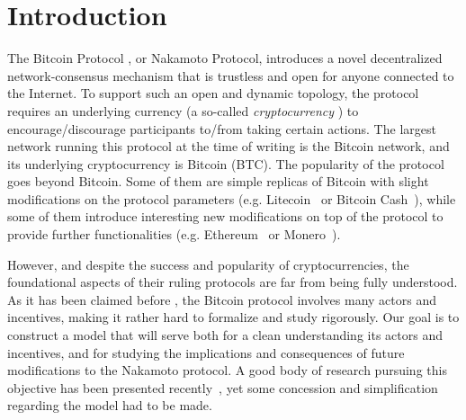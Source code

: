 
\section{Introduction}

The Bitcoin Protocol \cite{Bitcoin,DBLP:books/daglib/0040621,NC17}, or Nakamoto Protocol, introduces a novel decentralized network-consensus mechanism that is trustless and open for anyone connected to the Internet. %
To support such an open and dynamic topology, the protocol requires an underlying currency (a so-called \emph{cryptocurrency} \cite{NC17}) to encourage/discourage participants to/from taking certain actions. The largest network running this protocol at the time of writing is the Bitcoin network, and its underlying cryptocurrency is Bitcoin (BTC). %
The popularity of the protocol goes beyond Bitcoin. Some of them are simple replicas of Bitcoin with slight modifications on the protocol parameters (e.g. Litecoin~\cite{Litecoin} or Bitcoin Cash~\cite{Bcash}), while some of them introduce interesting new modifications on top of the protocol to provide further functionalities (e.g. Ethereum~\cite{Ethereum,E17} or Monero~\cite{Monero}). 
 

However, and despite the success and popularity of cryptocurrencies, the foundational aspects of their ruling protocols are far from being fully understood. As it has been claimed before \cite{mininggames:2016}, the Bitcoin protocol involves many actors and incentives, making it rather hard to formalize and study rigorously. Our 
goal is to construct a model that will serve both for a clean understanding its actors and incentives, and for studying the implications and consequences of future modifications to the 
Nakamoto protocol. A good body of research pursuing this objective has been presented recently~\cite{mininggames:2016,optimalselfishmining2017,instabilitywithoutreward:2016,selfishmining2014,stop_selfish_mining2014,eclipseattacks2015,LBSZR15,LJG15,stubborn_mining:2016,economics_of_mining2013,ZGR17,ABLZ17,MHG18,SZWTK18}, yet some concession and simplification regarding the model had to be made. 

